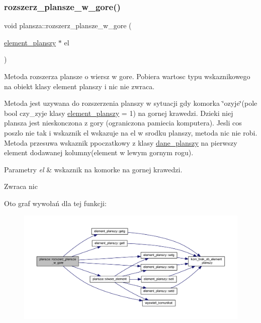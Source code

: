 \subsubsection{\texorpdfstring{rozszerz\+\_\+plansze\+\_\+w\+\_\+gore()}{rozszerz\_plansze\_w\_gore()}}
{\footnotesize\ttfamily void plansza\+::rozszerz\+\_\+plansze\+\_\+w\+\_\+gore (\begin{DoxyParamCaption}\item[{\mbox{\hyperlink{classelement__planszy}{element\+\_\+planszy}} $\ast$}]{el }\end{DoxyParamCaption})}

Metoda rozszerza plansze o wiersz w gore. Pobiera wartosc typu wskaznikowego na obiekt klasy element planszy i nic nie zwraca.

Metoda jest uzywana do rozszerzenia planszy w sytuacji gdy komorka \char`\"{}ozyje\char`\"{}(pole bool czy\+\_\+zyje klasy \mbox{\hyperlink{classelement__planszy}{element\+\_\+planszy}} = 1) na gornej krawedzi. Dzieki niej plansza jest nieskonczona z gory (ograniczona pamiecia komputera). Jesli cos poszlo nie tak i wskaznik el wskazuje na el w srodku planszy, metoda nic nie robi. Metoda przesuwa wskaznik ppoczatkowy z klasy \mbox{\hyperlink{classdane__planszy}{dane\+\_\+planszy}} na pierwszy element dodawanej kolumny(element w lewym gornym rogu). 
\begin{DoxyParams}{Parametry}
{\em el} & wskaznik na komorke na gornej krawedzi. \\
\hline
\end{DoxyParams}
\begin{DoxyReturn}{Zwraca}
nic 
\end{DoxyReturn}
Oto graf wywołań dla tej funkcji\+:
\nopagebreak
\begin{figure}[H]
\begin{center}
\leavevmode
\includegraphics[width=350pt]{classplansza_a47bf5f6dea6fad229b9c525638077df8_cgraph}
\end{center}
\end{figure}
